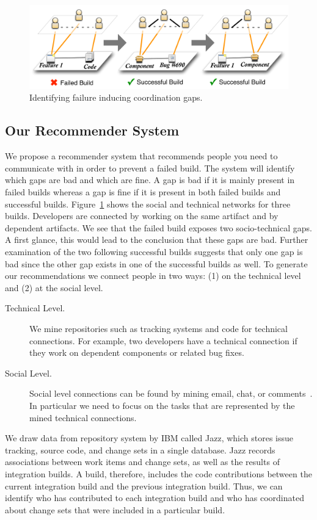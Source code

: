 \begin{figure}[t]
\centering
\includegraphics[width=0.9\columnwidth]{figures/bad-to-good}
\caption{Identifying failure inducing coordination gaps.}
\label{fig:multipleplanes}
\end{figure}

\subsection{Our Recommender System}
We propose a recommender system that recommends people you need to communicate with in order to prevent a 
failed build. The system will identify which gaps are bad 
and which are fine. A gap is bad if it is mainly present in 
failed builds whereas a gap is fine if it is present in both 
failed builds and successful builds. 
Figure~\ref{fig:multipleplanes} shows the social and technical networks for three 
builds. Developers are connected by working on the same 
artifact and by dependent artifacts. We see that the failed 
build exposes two socio-technical gaps. A first glance, this 
would lead to the conclusion that these gaps are bad. Further examination of the two following successful builds suggests that only one gap is bad since the other gap exists in 
one of the successful builds as well. 
To generate our recommendations we connect people in 
two ways: (1) on the technical level and (2) at the social 
level. 

\begin{description}
\item[Technical Level.] 
We mine repositories such as tracking systems and 
code for technical connections. For example, two developers have a technical connection if they work on 
dependent components or related bug fixes.
\item[Social Level.]
Social level connections can be found by mining email, chat, or comments~\cite{cataldo:cscw:2006}. In particular we need to 
focus on the tasks that are represented by the mined 
technical connections. 
\end{description}

We draw data from repository system by IBM called Jazz, which stores issue tracking, source code, and change sets in a single database. Jazz records associations between work items and change sets, as well as the results of integration builds. A build, therefore, includes the code contributions between the current integration build and the previous integration build. Thus, we can identify who has contributed to each integration build and who has coordinated about change sets that were included in a particular build.

